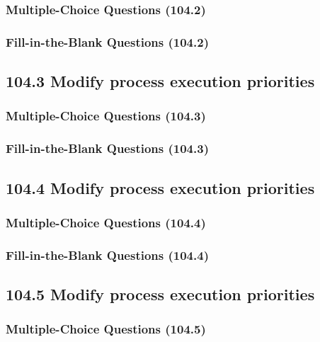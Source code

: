 \documentclass[a4paper]{report}
\begin{document}
\subsubsection*{Multiple-Choice Questions (104.2)}

\subsubsection*{Fill-in-the-Blank Questions (104.2)}

\subsection*{104.3 Modify process execution priorities}
\subsubsection*{Multiple-Choice Questions (104.3)}

\subsubsection*{Fill-in-the-Blank Questions (104.3)}

\subsection*{104.4 Modify process execution priorities}
\subsubsection*{Multiple-Choice Questions (104.4)}

\subsubsection*{Fill-in-the-Blank Questions (104.4)}

\subsection*{104.5 Modify process execution priorities}
\subsubsection*{Multiple-Choice Questions (104.5)}
\end{document}
